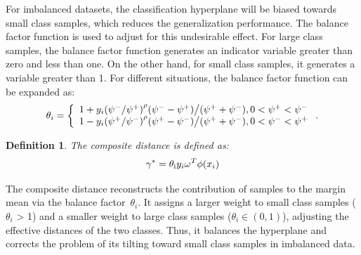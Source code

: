 \documentclass[a4paper]{cas-sc}
\newtheorem{myDef}{Definition}
\begin{document}
For imbalanced datasets, the classification hyperplane will be biased towards small class samples, which reduces the generalization performance. The balance factor function is used to adjust for this undesirable effect. For large class samples, the balance factor function generates an indicator variable greater than zero and less than one. On the other hand, for small class samples, it generates a variable greater than 1. For different situations, the balance factor function can be expanded as:
\begin{equation}
{\theta _i} = \left\{ \begin{array}{l}
{{1 + y_i{{({{{\psi ^ - }} \mathord{\left/
 {\vphantom {{{\psi ^ - }} {{\psi ^ + }}}} \right.
 \kern-\nulldelimiterspace} {{\psi ^ + }}})}^\rho }({\psi ^ - } - {\psi ^ + })} \mathord{\left/
 {\vphantom {{1 + y(i){{({{{\psi ^ - }} \mathord{\left/
 {\vphantom {{{\psi ^ - }} {{\psi ^ + }}}} \right.
 \kern-\nulldelimiterspace} {{\psi ^ + }}})}^\rho }({\psi ^ - } - {\psi ^ + })} {({\psi ^ + } + {\psi ^ - }),0 < {\psi ^ + } < {\psi ^ - }}}} \right.
 \kern-\nulldelimiterspace} {({\psi ^ + } + {\psi ^ - }),0 < {\psi ^ + } < {\psi ^ - }}}\\
{{1 - y_i{{({{{\psi ^ + }} \mathord{\left/
 {\vphantom {{{\psi ^ + }} {{\psi ^ - }}}} \right.
 \kern-\nulldelimiterspace} {{\psi ^ - }}})}^\rho }({\psi ^ + } - {\psi ^ - })} \mathord{\left/
 {\vphantom {{1 - y(i){{({{{\psi ^ + }} \mathord{\left/
 {\vphantom {{{\psi ^ + }} {{\psi ^ - }}}} \right.
 \kern-\nulldelimiterspace} {{\psi ^ - }}})}^\rho }({\psi ^ + } - {\psi ^ - })} {({\psi ^ + } + {\psi ^ - }),0 < {\psi ^ - } < {\psi ^ + }}}} \right.
 \kern-\nulldelimiterspace} {({\psi ^ + } + {\psi ^ - }),0 < {\psi ^ - } < {\psi ^ + }}}
\end{array} \right..
\end{equation}


\begin{myDef} 
The composite distance is defined as:
\begin{equation}
\gamma ^*={{\theta _{\rm{i}}}{y_i}{\omega ^T}\phi ({x_i})}
\label{cd}
\end{equation}
\end{myDef}

{\color{blue}The composite distance reconstructs the contribution of samples to the margin mean via the balance factor $\theta_i$. It assigns a larger weight to small class samples ($\theta_i$ > 1) and a smaller weight to large class samples ($\theta_i \in (0,1)$), adjusting the effective distances of the two classes. Thus, it balances the hyperplane and corrects the problem of its tilting toward small class samples in imbalanced data.}
\end{document}
